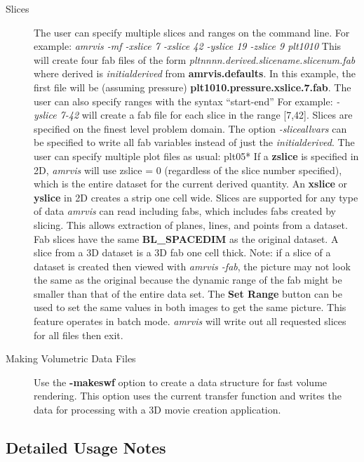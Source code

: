 \begin{description}
\item [Slices] The user can specify multiple slices and ranges on the command line.
For example:  {\em amrvis -mf -xslice 7 -xslice 42 -yslice 19 -zslice 9 plt1010}
This will create four fab files of the form
{\em pltnnnn.derived.slicename.slicenum.fab}
where derived is {\em initialderived} from {\bf amrvis.defaults}.
In this example, the
first file will be (assuming pressure) {\bf plt1010.pressure.xslice.7.fab}.
The user can also specify ranges with the syntax ``start-end''  For example:
{\em -yslice 7-42} will create a fab file for each slice in the range [7,42].
Slices are specified on the finest level problem domain.
The option {\em -sliceallvars} can be specified to write all fab variables
instead of just the {\em initialderived}.
The user can specify multiple plot files as usual:  plt05*
If a {\bf zslice} is specified in 2D, {\em amrvis} will use
zslice = 0 (regardless of the
slice number specified), which is the entire dataset for the current
derived quantity.  An {\bf xslice} or {\bf yslice} in 2D creates
a strip one cell wide.
Slices are supported for any type of data {\em amrvis} can read
including fabs, which includes fabs created by slicing.  This allows
extraction of planes, lines, and points from a dataset.
Fab slices have the same {\bf BL\_SPACEDIM} as the original dataset.  A slice from
a 3D dataset is a 3D fab one cell thick.
Note:  if a slice of a dataset is created then viewed with {\em amrvis -fab},
the picture may not look the same as the original
because the dynamic range of the fab might be smaller than that of
the entire data set.  The {\bf Set Range} button can be used to set
the same values in both images to get the same picture.
This feature operates in batch mode.
{\em amrvis} will write out all requested slices for all files then exit.

\item [Making Volumetric Data Files]  Use the {\bf -makeswf} option to create
a data structure for fast volume rendering.  This option uses the
current transfer function and writes the data for processing with
a 3D movie creation application.

\end{description}



\subsection{Detailed Usage Notes}


